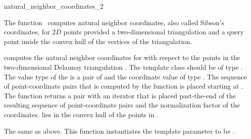 
\begin{ccRefFunction}{natural_neighbor_coordinates_2}  %

\ccDefinition
  
The function \ccRefName\ computes natural neighbor coordinates, also
called Sibson's coordinates, for $2D$ points provided a two-dimensional
triangulation and a query point inside the convex hull of the vertices
of the triangulation.



 {
  computes the natural neighbor coordinates for  with respect
  to the points in the two-dimensional Delaunay triangulation .
  The template class  should be of type
  .  The value type of the
   is a pair of  and the
  coordinate value of type . The sequence of
  point-coordinate pairs that is computed by the function is placed
  starting at . The function returns a pair with an iterator
  that is placed past-the-end of the resulting sequence of
  point-coordinate pairs and the normalization factor of the
  coordinates.
  \ccPrecond %
   lies in the convex hull of the
  points in .
  }  

%
{The same as above. This function instantiates the template parameter
   to be .}



\end{ccRefFunction}

